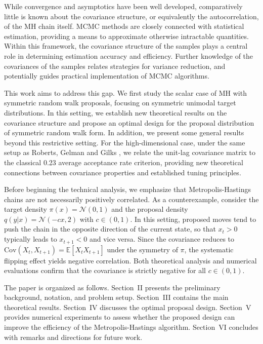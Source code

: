 \documentclass[conference]{IEEEtran}
\theoremstyle{definition}
\begin{document}
While convergence and asymptotics have been well developed, comparatively little is known about the covariance structure, or equivalently the autocorrelation, of the MH chain itself. 
MCMC methods are closely connected with statistical estimation, providing a means to approximate otherwise intractable quantities. 
Within this framework, the covariance structure of the samples plays a central role in determining estimation accuracy and efficiency. Further knowledge of the covariances of the samples relates strategies for variance reduction, and potentially guides practical implementation of MCMC algorithms.

This work aims to address this gap. 
We first study the scalar case of MH with symmetric random walk proposals, focusing on symmetric unimodal target distributions. In this setting, we establish new theoretical results on the covariance structure and propose an optimal design for the proposal distribution of symmetric random walk form. In addition, we present some general results beyond this restrictive setting. For the high-dimensional case, 
under the same setup as Roberts, Gelman and Gilks \cite{RobertsandGelman}, 
we relate the unit-lag covariance matrix to the classical 0.23 average acceptance rate criterion, providing new theoretical connections between covariance properties and established tuning principles.

Before beginning the technical analysis, we emphasize that Metropolis-Hastings chains are not necessarily positively correlated. 
As a counterexample, consider the target density $\pi(x)=\mathcal{N}(0,1)$ and the proposal density 
$q(y|x)=\mathcal{N}(-c x,2)$ with $c\in(0,1)$. 
In this setting, proposed moves tend to push the chain in the opposite direction of the current state, 
so that $x_t>0$ typically leads to $x_{t+1}<0$ and vice versa. 
Since the covariance reduces to $\mathrm{Cov}(X_t,X_{t+1})=\mathbb{E}[X_t X_{t+1}]$ under the symmetry of $\pi$, 
the systematic flipping effect yields negative correlation. Both theoretical analysis and numerical evaluations confirm that the covariance is strictly negative for all $c\in(0,1)$.



The paper is organized as follows. Section~II presents the preliminary background, notation, and problem setup. Section~III contains the main theoretical results. Section~IV discusses the optimal proposal design. Section~V provides numerical experiments to assess whether the proposed design can improve the efficiency of the Metropolis-Hastings algorithm. Section~VI concludes with remarks and directions for future work.
\end{document}
